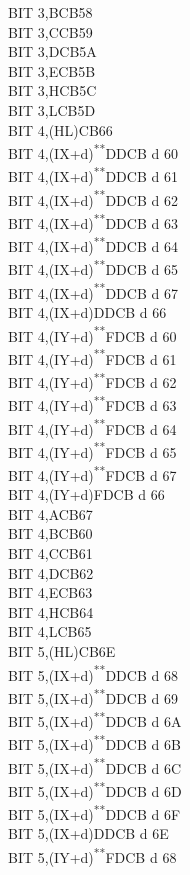 \documentclass[twoside,openright,a4paper]{book}
\newcommand{\UNDOC}{\textnormal{\textsuperscript{**}}}
\begin{document}
\begin{multicols}{3}
{\begin{tabbing}
	BIT 3,B\>CB58\\
	BIT 3,C\>CB59\\
	BIT 3,D\>CB5A\\
	BIT 3,E\>CB5B\\
	BIT 3,H\>CB5C\\
	BIT 3,L\>CB5D\\
	BIT 4,(HL)\>CB66\\
	BIT 4,(IX+d)\UNDOC\>DDCB d 60\\
	BIT 4,(IX+d)\UNDOC\>DDCB d 61\\
	BIT 4,(IX+d)\UNDOC\>DDCB d 62\\
	BIT 4,(IX+d)\UNDOC\>DDCB d 63\\
	BIT 4,(IX+d)\UNDOC\>DDCB d 64\\
	BIT 4,(IX+d)\UNDOC\>DDCB d 65\\
	BIT 4,(IX+d)\UNDOC\>DDCB d 67\\
	BIT 4,(IX+d)\>DDCB d 66\\
	BIT 4,(IY+d)\UNDOC\>FDCB d 60\\
	BIT 4,(IY+d)\UNDOC\>FDCB d 61\\
	BIT 4,(IY+d)\UNDOC\>FDCB d 62\\
	BIT 4,(IY+d)\UNDOC\>FDCB d 63\\
	BIT 4,(IY+d)\UNDOC\>FDCB d 64\\
	BIT 4,(IY+d)\UNDOC\>FDCB d 65\\
	BIT 4,(IY+d)\UNDOC\>FDCB d 67\\
	BIT 4,(IY+d)\>FDCB d 66\\
	BIT 4,A\>CB67\\
	BIT 4,B\>CB60\\
	BIT 4,C\>CB61\\
	BIT 4,D\>CB62\\
	BIT 4,E\>CB63\\
	BIT 4,H\>CB64\\
	BIT 4,L\>CB65\\
	BIT 5,(HL)\>CB6E\\
	BIT 5,(IX+d)\UNDOC\>DDCB d 68\\
	BIT 5,(IX+d)\UNDOC\>DDCB d 69\\
	BIT 5,(IX+d)\UNDOC\>DDCB d 6A\\
	BIT 5,(IX+d)\UNDOC\>DDCB d 6B\\
	BIT 5,(IX+d)\UNDOC\>DDCB d 6C\\
	BIT 5,(IX+d)\UNDOC\>DDCB d 6D\\
	BIT 5,(IX+d)\UNDOC\>DDCB d 6F\\
	BIT 5,(IX+d)\>DDCB d 6E\\
	BIT 5,(IY+d)\UNDOC\>FDCB d 68\\

\end{tabbing}}
\end{multicols}
\end{document}
